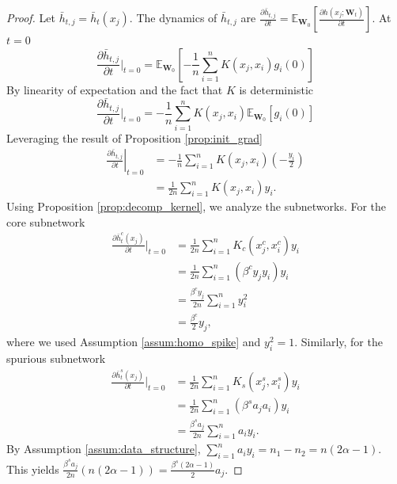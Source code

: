 \documentclass[letter,11pt]{article}
\begin{document}
\begin{proof}
Let $\bar{h}_{t,j} = \bar{h}_t(x_j)$. The dynamics of $\bar{h}_{t,j}$ are $\frac{\partial \bar{h}_{t,j}}{\partial t} = \mathbb{E}_{\mathbf{W}_0} \left[ \frac{\partial h(x_j; \mathbf{W}_t)}{\partial t} \right]$. At $t=0$
\begin{equation}
   \frac{\partial \bar{h}_{t,j}}{\partial t} \Big|_{t=0} = \mathbb{E}_{\mathbf{W}_0} \left[ -\frac{1}{n} \sum_{i=1}^n K(x_j, x_i) g_i(0) \right] 
\end{equation}
By linearity of expectation and the fact that $K$ is deterministic
\begin{equation}
    \frac{\partial \bar{h}_{t,j}}{\partial t} \Big|_{t=0} = -\frac{1}{n} \sum_{i=1}^n K(x_j, x_i) \mathbb{E}_{\mathbf{W}_0}[g_i(0)]
\end{equation}
Leveraging the result of Proposition \ref{prop:init_grad}
\begin{equation}
\begin{aligned}
\left.\frac{\partial \bar{h}_{t,j}}{\partial t}\right|_{t=0}
&= -\frac{1}{n} \sum_{i=1}^n K(x_j, x_i)\left(-\frac{y_i}{2}\right) \\
&= \frac{1}{2n} \sum_{i=1}^n K(x_j, x_i) y_i.
\end{aligned}
\end{equation}
Using Proposition \ref{prop:decomp_kernel}, we analyze the subnetworks. For the core subnetwork
\begin{equation}
\begin{aligned}
\frac{\partial \bar{h}_t^c(x_j)}{\partial t} \Big|_{t=0}
    &= \frac{1}{2n} \sum_{i=1}^n K_c(x_j^c, x_i^c) y_i \\
    &= \frac{1}{2n} \sum_{i=1}^n (\beta^c y_j y_i) y_i \\
    &= \frac{\beta^c y_j}{2n} \sum_{i=1}^n y_i^2 \\
    &= \frac{\beta^c}{2} y_j,
\end{aligned}
\end{equation}
where we used Assumption \ref{assum:homo_spike} and $y_i^2 = 1$. Similarly, for the spurious subnetwork
\begin{equation}
\begin{aligned}
\frac{\partial \bar{h}_t^s(x_j)}{\partial t} \Big|_{t=0}
    &= \frac{1}{2n} \sum_{i=1}^n K_s(x_j^s, x_i^s) y_i \\
    &= \frac{1}{2n} \sum_{i=1}^n (\beta^s a_j a_i) y_i \\
    &= \frac{\beta^s a_j}{2n} \sum_{i=1}^n a_i y_i .
\end{aligned}
\end{equation}
By Assumption \ref{assum:data_structure}, $\sum_{i=1}^n a_i y_i = n_1 - n_2 = n(2\alpha - 1)$. This yields $\frac{\beta^s a_j}{2n} (n(2\alpha-1)) = \frac{\beta^s (2\alpha - 1)}{2} a_j$.
\end{proof}
\end{document}
